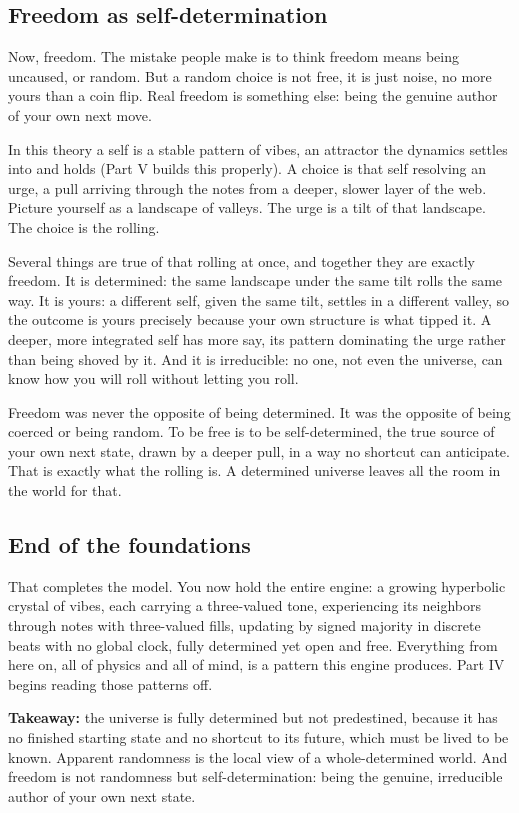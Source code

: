 \subsection{Freedom as self-determination}

Now, freedom. The mistake people make is to think freedom means being uncaused, or random. But a random choice is not free, it is just noise, no more yours than a coin flip. Real freedom is something else: being the genuine author of your own next move.

In this theory a self is a stable pattern of vibes, an attractor the dynamics settles into and holds (Part V builds this properly). A choice is that self resolving an urge, a pull arriving through the notes from a deeper, slower layer of the web. Picture yourself as a landscape of valleys. The urge is a tilt of that landscape. The choice is the rolling.

Several things are true of that rolling at once, and together they are exactly freedom. It is determined: the same landscape under the same tilt rolls the same way. It is yours: a different self, given the same tilt, settles in a different valley, so the outcome is yours precisely because your own structure is what tipped it. A deeper, more integrated self has more say, its pattern dominating the urge rather than being shoved by it. And it is irreducible: no one, not even the universe, can know how you will roll without letting you roll.

Freedom was never the opposite of being determined. It was the opposite of being coerced or being random. To be free is to be self-determined, the true source of your own next state, drawn by a deeper pull, in a way no shortcut can anticipate. That is exactly what the rolling is. A determined universe leaves all the room in the world for that.

\subsection{End of the foundations}

That completes the model. You now hold the entire engine: a growing hyperbolic crystal of vibes, each carrying a three-valued tone, experiencing its neighbors through notes with three-valued fills, updating by signed majority in discrete beats with no global clock, fully determined yet open and free. Everything from here on, all of physics and all of mind, is a pattern this engine produces. Part IV begins reading those patterns off.

\textbf{Takeaway:} the universe is fully determined but not predestined, because it has no finished starting state and no shortcut to its future, which must be lived to be known. Apparent randomness is the local view of a whole-determined world. And freedom is not randomness but self-determination: being the genuine, irreducible author of your own next state.
